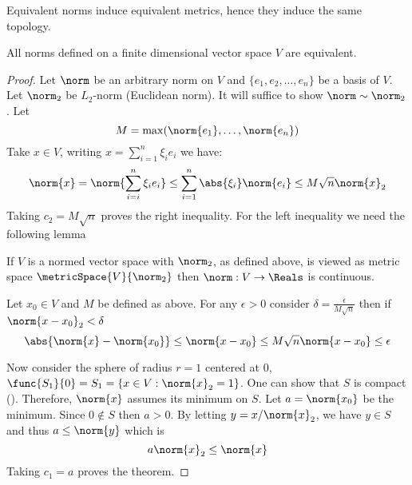 \begin{remark}
    Equivalent norms induce equivalent metrics, hence they induce the same topology.
\end{remark}

\begin{theorem} \label{th:normsEquivalent}
    All norms defined on a finite dimensional vector space \(V\) are equivalent.
\end{theorem}

\begin{proof}
    Let \(\norm\) be an arbitrary norm on \(V\) and \(\{e_1, e_2, \dots , e_n\} \) be a basis of \(V\). Let \(\norm_2\) be \(L_2\)-norm (Euclidean norm). It will suffice to show \(\norm \sim \norm_2\). Let
    \begin{equation*}
        M = \max \! \left( \norm{e_1}, \dots , \norm{e_n} \right)
    \end{equation*}
    Take \(x \in V\), writing \(x = \sum_{i = 1}^n {\xi_i e_i}\) we have:
    \begin{equation*}
        \norm{x} = \norm{\sum_{i = i}^n {\xi_i e_i}} \leq \sum_{i = 1}^n \abs{\xi_i} \norm{e_i} \leq M \sqrt{n} \norm{x}_2
    \end{equation*}
    Taking \(c_2 = M \sqrt{n}\) proves the right inequality. For the left inequality we need the following lemma
    \begin{lemma} \label{lm:ContinuityOfNorm}
        If \(V\) is a normed vector space with \(\norm_2\), as defined above, is viewed as metric space \(\metricSpace{V}{\norm_2}\) then \(\norm : V \to \Reals\) is continuous.
    \end{lemma}

    \begin{prooflemma}
        Let \(x_0 \in V\) and \(M\) be defined as above. For any \(\epsilon > 0\) consider \(\delta = \frac{\epsilon}{M \sqrt{n}}\) then if \(\norm{x - x_0}_2 < \delta\)
        \begin{equation*}
            \abs{{\norm{x} - \norm{x_0}}} \leq \norm{x - x_0} \leq M \sqrt{n} \norm{x - x_0} \leq \epsilon
        \end{equation*}
    \end{prooflemma}

    Now consider the sphere of radius \(r = 1\) centered at \(0\), \(\func{S_1}{0} = S_1 = \{x \in V : \norm{x}_2 = 1\}\). One can show that \(S\) is compact (). Therefore, \(\norm{x}\) assumes its minimum on \(S\). Let \( a = \norm{x_0}\) be the minimum. Since \(0 \notin S\) then \(a > 0\). By letting \(y = x / \norm{x}_2 \), we have \(y \in S\) and thus \(a \leq \norm{y}\) which is
    \begin{equation*}
        a \norm{x}_2 \leq \norm{x}
    \end{equation*}
    Taking \(c_1 = a\) proves the theorem.
\end{proof}

